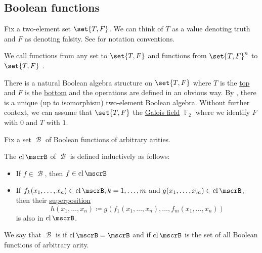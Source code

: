 \subsection{Boolean functions}\label{subsec:boolean_functions}

\begin{definition}\label{def:boolean_function}
  Fix a two-element set \( \set{ T, F } \). We can think of \( T \) as a value denoting truth and \( F \) as denoting falsity. See  for notation conventions.

  We call functions from any set to \( \set{ T, F } \)  and functions from \( \set{ T, F }^n \) to \( \set{ T, F } \) .

  There is a natural Boolean algebra structure on \( \set{ T, F } \) where \( T \) is the \hyperref[def:samilattice/join]{top} and \( F \) is the \hyperref[def:samilattice/meet]{bottom} and the operations are defined in an obvious way. By , there is a unique (up to isomorphism) two-element Boolean algebra. Without further context, we can assume that \( \set{ T, F } \) the \hyperref[thm:galois_field_existence]{Galois field} \( \BbbF_2 \) where we identify \( F \) with \( 0 \) and \( T \) with \( 1 \).
\end{definition}

\begin{definition}\label{def:boolean_closure}
  Fix a set \( \mscrB \) of Boolean functions of arbitrary arities.

  The  \( \cl{\mscrB} \) of \( \mscrB \) is defined inductively as follows:
  \begin{itemize}
    \item If \( f \in \mscrB \), then \( f \in \cl{\mscrB} \)
    \item If \( f_k(x_1, \ldots, x_n) \in \cl{\mscrB}, k = 1, \ldots, m \) and \( g(x_1, \ldots, x_m) \in \cl{\mscrB} \), then their \hyperref[def:function/superposition]{superposition}
    \begin{equation*}
      h(x_1, \ldots, x_n) \coloneqq g(f_1(x_1, \ldots, x_n), \ldots, f_m(x_1, \ldots, x_n))
    \end{equation*}
    is also in \( \cl{\mscrB} \).
  \end{itemize}

  We say that \( \mscrB \) is  if \( \cl{\mscrB} = \mscrB \) and  if \( \cl{\mscrB} \) is the set of all Boolean functions of arbitrary arity.
\end{definition}


